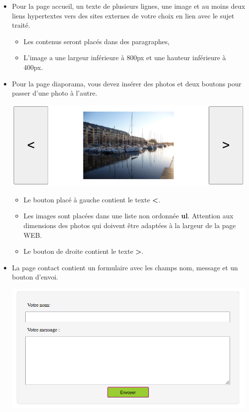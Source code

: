 \documentclass[11pt]{article}
\providecommand{\tightlist}{%
      \setlength{\itemsep}{0pt}\setlength{\parskip}{0pt}}
\begin{document}
\begin{itemize}
\item
  Pour la page accueil, un texte de plusieurs lignes, une image et au
  moins deux liens hypertextes vers des sites externes de votre choix en
  lien avec le sujet traité.

  \begin{itemize}
  \tightlist
  \item
    Les contenus seront placés dans des paragraphes,
  \item
    L'image a une largeur inférieure à 800px et une hauteur inférieure à
    400px.
  \end{itemize}
\item
  Pour la page diaporama, vous devez insérer des photos et deux boutons
  pour passer d'une photo à l'autre.

  \begin{center}
  \includegraphics[scale=0.8]{img/diaporama.png}
  \end{center}

  \begin{itemize}
  \tightlist
  \item
    Le bouton placé à gauche contient le texte \textbf{\textless{}}.
  \item
    Les images sont placées dans une liste non ordonnée \textbf{ul}.
    Attention aux dimensions des photos qui doivent être adaptées à la
    largeur de la page WEB.
  \item
    Le bouton de droite contient le texte \textbf{\textgreater{}}.
  \end{itemize}
\item
  La page contact contient un formulaire avec les champs nom, message et
  un bouton d'envoi.

\begin{center}
  \includegraphics[scale=0.8]{img/formulaire.png}
\end{center}


\end{itemize}
\end{document}
